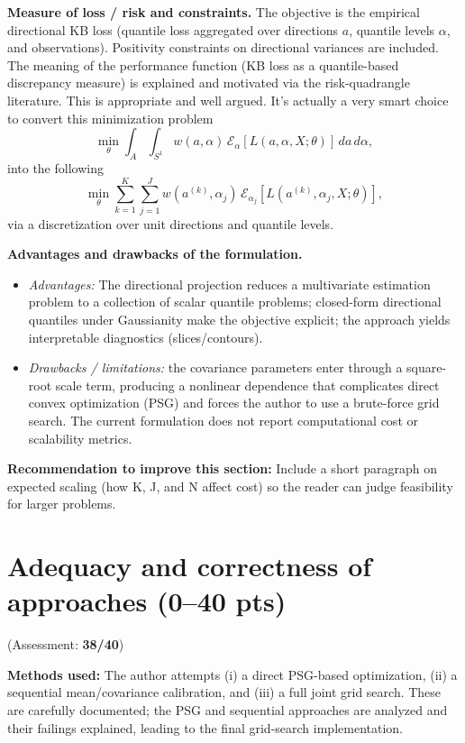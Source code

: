 \documentclass[11pt]{article}
\begin{document}
	\textbf{Measure of loss / risk and constraints.} The objective is the empirical directional KB loss (quantile loss aggregated over directions \(a\), quantile levels \(\alpha\), and observations). Positivity constraints on directional variances are included. The meaning of the performance function (KB loss as a quantile-based discrepancy measure) is explained and motivated via the risk-quadrangle literature. This is appropriate and well argued. It's actually a very smart choice to convert this minimization problem
	\[
	\min_{\theta} \int_A \int_{S^1} w(a, \alpha) \, \mathcal{E}_\alpha [L(a, \alpha, X; \theta)] \, da \, d\alpha,
	\]
	into the following
	\[
	\min_{\theta} \sum_{k=1}^K \sum_{j=1}^J w(a^{(k)}, \alpha_j) \, \mathcal{E}_{\alpha_j} [L(a^{(k)}, \alpha_j, X; \theta)],
	\]
	via a discretization over unit directions and quantile levels. 
	
	\textbf{Advantages and drawbacks of the formulation.}
	\begin{itemize}
		\item \emph{Advantages:} The directional projection reduces a multivariate estimation problem to a collection of scalar quantile problems; closed-form directional quantiles under Gaussianity make the objective explicit; the approach yields interpretable diagnostics (slices/contours).
		\item \emph{Drawbacks / limitations:} the covariance parameters enter through a square-root scale term, producing a nonlinear dependence that complicates direct convex optimization (PSG) and forces the author to use a brute-force grid search. The current formulation does not report computational cost or scalability metrics.
	\end{itemize}
	
	\textbf{Recommendation to improve this section:} Include a short paragraph on expected scaling (how K, J, and N affect cost) so the reader can judge feasibility for larger problems.
	
	\section{Adequacy and correctness of approaches (0--40 pts)}
	
	(Assessment: \textbf{38/40})
	
	\textbf{Methods used:} The author attempts (i) a direct PSG-based optimization, (ii) a sequential mean/covariance calibration, and (iii) a full joint grid search. These are carefully documented; the PSG and sequential approaches are analyzed and their failings explained, leading to the final grid-search implementation.
	
\end{document}
